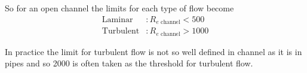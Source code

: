 \documentclass[a4paper, 12pt, british]{article} %
\numberwithin{equation}{section}
\numberwithin{figure}{section}
\numberwithin{table}{section}
\begin{document}
So for an open channel the limits for each type of flow become
\begin{align*}
\text{Laminar}&:  R_{e \text{ channel}} < 500 \\
\text{Turbulent}&:  R_{e \text{ channel}} > 1000
\end{align*}


In practice the limit for turbulent flow is not so well defined in channel as it is in pipes and so 2000 is often taken as the threshold for turbulent flow.

%
%
%
% 
%
%  
%
%
%
%
%
\end{document}
